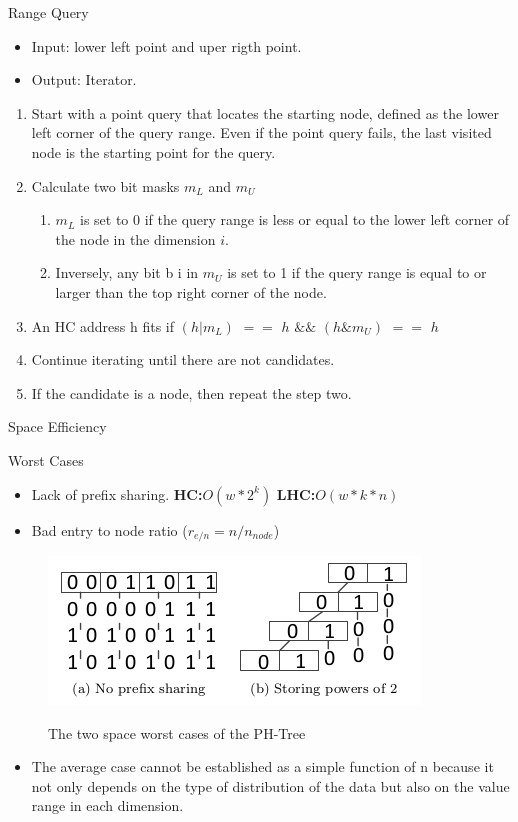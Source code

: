 \documentclass{beamer}
\begin{document}
\begin{frame}{Range Query}
  \begin{itemize}
   \item Input: lower left point and uper rigth point.
   \item Output: Iterator.
  \end{itemize}
  \begin{enumerate}
   \item Start with a point query that locates the starting node, defined as the lower left corner of the query range. Even if the point query fails, the last visited node
    is the starting point for the query.
   \item Calculate two bit masks $m_{L}$ and $m_{U}$
   \begin{enumerate}
    \item $m_{L}$ is set to 0 if the query range is less or equal to the lower left corner of the node in the dimension $i$.
    \item Inversely, any bit b i in $m_{U}$ is set to 1 if the query range is equal to or larger than the top right corner of the node.
   \end{enumerate}
   \item An HC address h fits if $(h|m_{L})$ $==$ $h$ $\&\&$ $(h\&m_{U})$ $==$ $h$
   \item Continue iterating until there are not candidates.
   \item If the candidate is a node, then repeat the step two.
  \end{enumerate}
\end{frame}

\begin{frame}{Space Efficiency}
 \begin{block}{Worst Cases}
   \begin{itemize}
    \item Lack of prefix sharing. \textbf{HC:}$O(w * 2^{k})$  \textbf{LHC:}$O(w * k * n)$
    \item Bad entry to node ratio     ($r_{e/n} = n/n_{node}$)
   \end{itemize}
 \end{block}
 \begin{figure}
  \centering
  \includegraphics[scale = 0.5]{11.png}
  \label{fig11}
  \caption{The two space worst cases of the PH-Tree}
 \end{figure}

 \begin{itemize}  
 \item The average case cannot be established as a simple function of n because it not only depends on the type of distribution of the data but also on the value range in each dimension.
 \end{itemize}
 
\end{frame}
\end{document}
